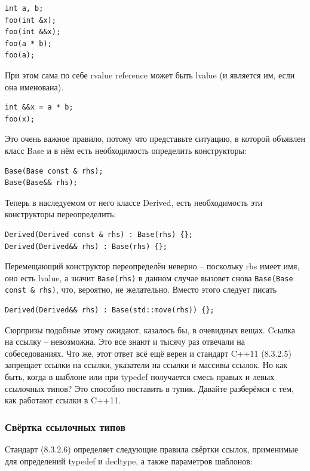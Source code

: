 \documentclass[a4paper,12pt,oneside]{article}
\begin{document}
\begin{lstlisting}
int a, b;
foo(int &x);
foo(int &&x);
foo(a * b);
foo(a);
\end{lstlisting}

При этом сама по себе rvalue reference может быть lvalue (и является им, если она именована).

\begin{lstlisting}
int &&x = a * b;
foo(x);
\end{lstlisting}

Это очень важное правило, потому что представьте ситуацию, в которой объявлен класс Base и в нём есть необходимость определить конструкторы:

\begin{lstlisting}
Base(Base const & rhs);
Base(Base&& rhs);
\end{lstlisting}

Теперь в наследуемом от него классе Derived, есть необходимость эти конструкторы переопределить:

\begin{lstlisting}
Derived(Derived const & rhs) : Base(rhs) {};
Derived(Derived&& rhs) : Base(rhs) {};
\end{lstlisting}

Перемещающий конструктор переопределён неверно -- поскольку rhs имеет имя, оно есть lvalue, а значит \lstinline!Base(rhs)! в данном случае вызовет снова \lstinline!Base(Base const & rhs)!, что, вероятно, не желательно. Вместо этого следует писать

\begin{lstlisting}
Derived(Derived&& rhs) : Base(std::move(rhs)) {};
\end{lstlisting}

Сюрпризы подобные этому ожидают, казалось бы, в очевидных вещах. Ccылка на ссылку -- невозможна. Это все знают и тысячу раз отвечали на собеседованиях. Что же, этот ответ всё ещё верен и стандарт C++11 (8.3.2.5) запрещает ссылки на ссылки, указатели на ссылки и массивы ссылок. Но как быть, когда в шаблоне или при typedef получается смесь правых и левых ссылочных типов? Это способно поставить в тупик. Давайте разберёмся с тем, как работают ссылки в C++11.

\subsubsection{Свёртка ссылочных типов}

Стандарт (8.3.2.6) определяет следующие правила свёртки ссылок, применимые для определений typedef и decltype, а также параметров шаблонов:
\end{document}
